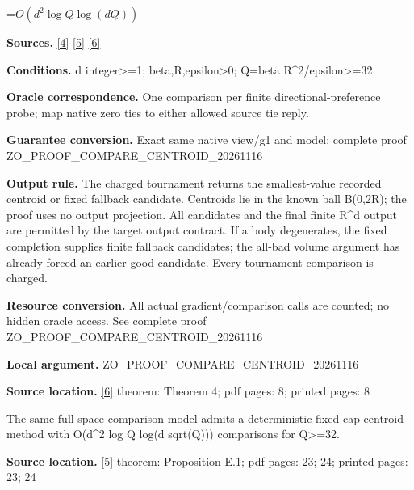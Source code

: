 \documentclass[10pt,a4paper]{article}
\newcommand{\AtlasMath}[1]{\par\begingroup\centering\setbox0=\hbox{$\displaystyle #1$}\ifdim\wd0>1.4\linewidth\typeout{ATLAS WIDE FORMULA: \the\wd0}\fi\ifdim\wd0>\linewidth\resizebox{\linewidth}{!}{\box0}\else\box0\fi\par\endgroup}
\begin{document}
\AtlasMath{O(d^2\log Q\log(dQ))}


\textbf{Sources.} \href{https://arxiv.org/pdf/1405.4980v2}{[4]} \href{https://arxiv.org/html/2611.29533v1}{[5]} \href{https://github.com/WU-Wendao/Colombo/blob/main/colombo_sensorium/Complexity_altas/data/sources/colombo/COLOMBO_KIMI_002/kimi_002.pdf}{[6]}



\textbf{Conditions.} d integer>=1; beta,R,epsilon>0; Q=beta R\textasciicircum{}2/epsilon>=32.



\textbf{Oracle correspondence.} One comparison per finite directional-preference probe; map native zero ties to either allowed source tie reply.



\textbf{Guarantee conversion.} Exact same native view/g1 and model; complete proof ZO\_PROOF\_COMPARE\_CENTROID\_20261116



\textbf{Output rule.} The charged tournament returns the smallest-value recorded centroid or fixed fallback candidate. Centroids lie in the known ball B(0,2R); the proof uses no output projection. All candidates and the final finite R\textasciicircum{}d output are permitted by the target output contract. If a body degenerates, the fixed completion supplies finite fallback candidates; the all-bad volume argument has already forced an earlier good candidate. Every tournament comparison is charged.



\textbf{Resource conversion.} All actual gradient/comparison calls are counted; no hidden oracle access. See complete proof ZO\_PROOF\_COMPARE\_CENTROID\_20261116



\textbf{Local argument.} ZO\_PROOF\_COMPARE\_CENTROID\_20261116



\textbf{Source location.} \href{https://github.com/WU-Wendao/Colombo/blob/main/colombo_sensorium/Complexity_altas/data/sources/colombo/COLOMBO_KIMI_002/kimi_002.pdf}{[6]} theorem: Theorem 4; pdf pages: 8; printed pages: 8



The same full-space comparison model admits a deterministic fixed-cap centroid method with O(d\textasciicircum{}2 log Q log(d sqrt(Q))) comparisons for Q>=32.



\textbf{Source location.} \href{https://arxiv.org/html/2611.29533v1}{[5]} theorem: Proposition E.1; pdf pages: 23; 24; printed pages: 23; 24
\end{document}
